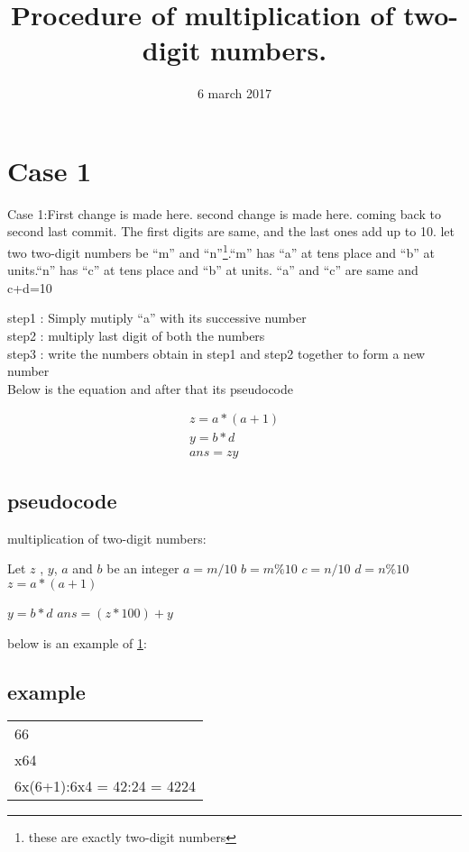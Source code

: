 \documentclass{article}
\title{\huge Procedure of multiplication of two-digit numbers.}
\date{6 march 2017}
\begin{document}
\begin{titlepage}
\maketitle
\end{titlepage}
\newpage
\section{Case 1} \label{case 1}
\noindent Case 1:First change is made here.
second change is made here. 
coming back to second last commit.
 The first digits are same, and the last ones add up to 10.
let two two-digit numbers be ``m'' and ``n''\footnote{these are exactly two-digit numbers}.``m'' has ``a'' at tens place and ``b'' at units.``n'' has ``c'' at tens place and ``b'' at units. ``a'' and ``c'' are same and c+d=10\cite{athar}

\noindent step1 : Simply mutiply ``a'' with its successive number \\
step2 : multiply last digit of both the numbers \\
step3 : write the numbers obtain in step1 and step2 together to form a new number\\

\noindent Below is the equation and after that its pseudocode


\begin{align*}
	z=a*(a+1)  \\
	y=b*d \\
	ans=zy
	\end{align*}
\subsection{pseudocode}
  \begin{algorithm}
   \caption{multiplication of two-digit numbers: }
    \begin{algorithmic}[1]
	\State 

	\State Let $z$ , $y$, $a$ and $b$ be an integer
\State $a=m/10$
\State $b=m\%10$
\State $c=n/10$
\State $d=n\%10$
	\State $z=a*(a+1)$
	
	\State $y=b*d$
	\State $ans=(z*100)+y$ 
	
	\EndIf
	\EndFunction
\end{algorithmic}
\end{algorithm}
\noindent below is an example of \ref{case 1}:
\newline
\subsection{example}
\begin{tabular}{l} 
66\\

x64\\

6x(6+1):6x4 = 42:24 = 4224\\
\end{tabular}
\end{document}
